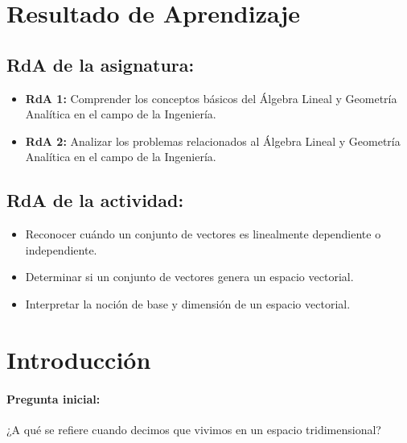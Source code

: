 \documentclass[a4,11pt]{aleph-notas}
\begin{document}
\encabezado


\section*{Resultado de Aprendizaje}

\subsection*{RdA de la asignatura:}
\begin{itemize}[leftmargin=*]
    \item \textbf{RdA 1:} Comprender los conceptos básicos del Álgebra Lineal y Geometría Analítica en el campo de la Ingeniería.
    \item \textbf{RdA 2:} Analizar los problemas relacionados al Álgebra Lineal y Geometría Analítica en el campo de la Ingeniería.
\end{itemize}

\subsection*{RdA de la actividad:}
\begin{itemize}[leftmargin=*]
    \item Reconocer cuándo un conjunto de vectores es linealmente dependiente o independiente.
    \item Determinar si un conjunto de vectores genera un espacio vectorial.
    \item Interpretar la noción de base y dimensión de un espacio vectorial.
\end{itemize}

\section*{Introducción}

\paragraph{Pregunta inicial:} 
¿A qué se refiere cuando decimos que vivimos en un espacio tridimensional?
\end{document}
